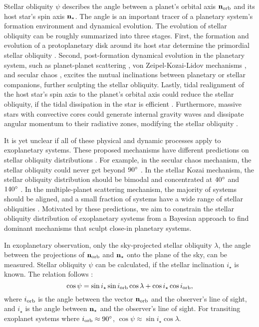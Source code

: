 \documentclass[twocolumn,times]{aastex631}
\begin{document}
Stellar obliquity $\psi$ describes the angle between a planet's orbital axis $\bf{n}_{\rm orb}$ and its host star's spin axis $\bf{n}_{\star}$. 
The angle is an important tracer of a planetary system's formation environment and dynamical evolution. The evolution of stellar obliquity can be roughly summarized into three stages. First, the formation and evolution of a protoplanetary disk around its host star determine the primordial stellar obliquity \citep[e.g.,][]{Bate10, Lai11, Batygin12}. Second, post-formation dynamical evolution in the planetary system, such as planet-planet scattering \citep[e.g.,][]{Rasio96, Chatterjee08, Nagasawa08, Beague12}, von Zeipel-Kozai-Lidov mechanisms \citep[e.g.,][]{Wu03, Naoz16}, and secular chaos \citep{Wu11}, excites the mutual inclinations between planetary or stellar companions, further sculpting the stellar obliquity. Lastly, tidal realignment of the host star's spin axis to the planet's orbital axis could reduce the stellar obliquity, if the tidal dissipation in the star is efficient \citep[e.g.,][]{Winn10, Albrecht12}. Furthermore, massive stars with convective cores could generate internal gravity waves and dissipate angular momentum to their radiative zones, modifying the stellar obliquity \citep{Rogers12, Rogers13}.

It is yet unclear if all of these physical and dynamic processes apply to exoplanetary systems. These proposed mechanisms have different predictions on stellar obliquity distributions \citep[see][and references therein]{Albrecht22}. For example, in the secular chaos mechanism, the stellar obliquity could never get beyond $90\mbox{$^\circ$}$ \citep{Teyssandier19}. In the stellar Kozai mechanism, the stellar obliquity distribution should be bimodal and concentrated at $40\mbox{$^\circ$}$ and $140\mbox{$^\circ$}$ \citep[e.g.,][]{Fabrycky07, Anderson16, Vick19}. In the multiple-planet scattering mechanism, the majority of systems should be aligned, and a small fraction of systems have a wide range of stellar obliquities \citep[e.g.,][]{Beague12}. Motivated by these predictions, we aim to constrain the stellar obliquity distribution of exoplanetary systems from a Bayesian approach to find dominant mechanisms that sculpt close-in planetary systems.

In exoplanetary observation, only the sky-projected stellar obliquity $\lambda$, the angle between the projections of $\bf{n}_{\rm orb}$ and $\bf{n}_{\star}$ onto the plane of the sky, can be measured. Stellar obliquity $\psi$ can be calculated, if the stellar inclination $i_\star$ is known. The relation follows \citep[e.g.,][]{Fabrycky09}:
\begin{equation}\label{eqn:psi}
    \cos{\psi} = \sin{i_\star}\sin{i_{\rm orb}}\cos{\lambda} + \cos{i_\star}\cos{i_{\rm orb}},
\end{equation}
where $i_{\rm orb}$ is the angle between the vector $\bf{n}_{\rm orb}$ and the observer's line of sight, and $i_\star$ is the angle between $\bf{n}_{\star}$ and the observer's line of sight.
For transiting exoplanet systems where $i_{\rm orb} \approx 90\mbox{$^\circ$}$, $\cos{\psi} \approx \sin{i_\star}\cos{\lambda}$.
\end{document}
